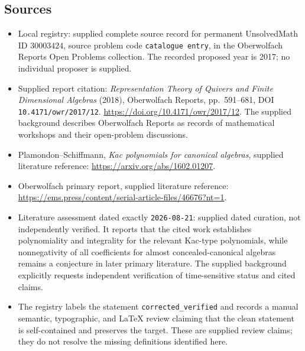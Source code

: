 \documentclass[11pt]{article}
\begin{document}
\subsection{Sources}
\begin{itemize}
\item Local registry: supplied complete source record for permanent UnsolvedMath ID \(30003424\), source problem code \texttt{catalogue entry}, in the Oberwolfach Reports Open Problems collection. The recorded proposed year is 2017; no individual proposer is supplied.
\item Supplied report citation: \emph{Representation Theory of Quivers and Finite Dimensional Algebras} (2018), Oberwolfach Reports, pp.~591--681, DOI \texttt{10.4171/owr/2017/12}. \url{https://doi.org/10.4171/owr/2017/12}. The supplied background describes Oberwolfach Reports as records of mathematical workshops and their open-problem discussions.
\item Plamondon--Schiffmann, \emph{Kac polynomials for canonical algebras}, supplied literature reference: \url{https://arxiv.org/abs/1602.01207}.
\item Oberwolfach primary report, supplied literature reference: \url{https://ems.press/content/serial-article-files/46676?nt=1}.
\item Literature assessment dated exactly \texttt{2026-08-21}: supplied dated curation, not independently verified. It reports that the cited work establishes polynomiality and integrality for the relevant Kac-type polynomials, while nonnegativity of all coefficients for almost concealed-canonical algebras remains a conjecture in later primary literature. The supplied background explicitly requests independent verification of time-sensitive status and cited claims.
\item The registry labels the statement \texttt{corrected\_verified} and records a manual semantic, typographic, and LaTeX review claiming that the clean statement is self-contained and preserves the target. These are supplied review claims; they do not resolve the missing definitions identified here.
\end{itemize}
\end{document}
